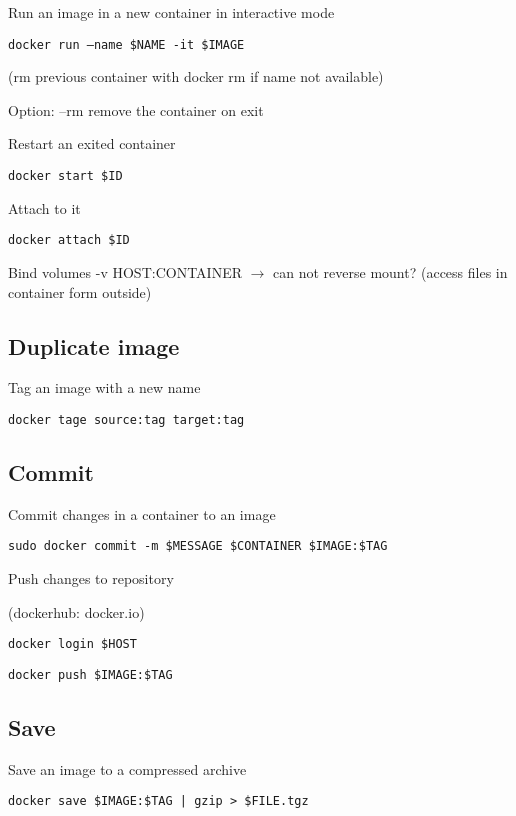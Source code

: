 Run an image in a new container in interactive mode

\texttt{docker run --name \$NAME -it \$IMAGE}

(rm previous container with docker rm if name not available)

Option: --rm remove the container on exit

Restart an exited container

\texttt{docker start \$ID}

Attach to it

\texttt{docker attach \$ID}

Bind volumes -v HOST:CONTAINER
$\rightarrow$ can not reverse mount? (access files in container form outside)


\subsection*{Duplicate image}


Tag an image with a new name

\texttt{docker tage source:tag target:tag}

\subsection*{Commit}

Commit changes in a container to an image

\texttt{sudo docker commit -m \$MESSAGE \$CONTAINER \$IMAGE:\$TAG}

\bigskip

Push changes to repository

(dockerhub: docker.io)

\texttt{docker login \$HOST}

\texttt{docker push \$IMAGE:\$TAG}



\subsection*{Save}


Save an image to a compressed archive

\texttt{docker save \$IMAGE:\$TAG | gzip > \$FILE.tgz }




%
%



